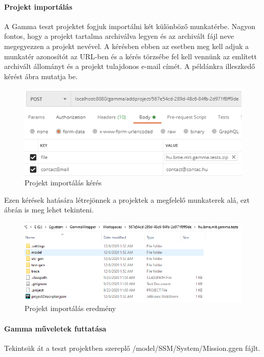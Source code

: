 \paragraph{Projekt importálás} A Gamma teszt projektet fogjuk importálni két különböző munkatérbe. Nagyon fontos, hogy a projekt tartalma archiválva legyen és az archivált fájl neve megegyezzen a projekt nevével. A kérésben ebben az esetben meg kell adjuk a munkatér azonosítót az URL-ben és a kérés törzsébe fel kell vennünk az említett archivált állományt és a projekt tulajdonos e-mail címét. A példánkra illeszkedő kérést  ábra mutatja be.


\begin{figure}[!ht]
	\includegraphics[keepaspectratio]{figures/add_project_request.PNG}
	\caption{Projekt importálás kérés}
	\label{fig:add_project_request}
\end{figure}

Ezen kérések hatására létrejönnek a projektek a megfelelő munkaterek alá, ezt  ábrán is meg lehet tekinteni.

\begin{figure}[!ht]
	\includegraphics[width=150mm, keepaspectratio]{figures/add_project_result.PNG}
	\caption{Projekt importálás eredmény}
	\label{fig:add_project_result}
\end{figure}

\paragraph{Gamma műveletek futtatása} Tekintsük át a teszt projektben szereplő /model/SSM/System/Mission.ggen fájlt.

